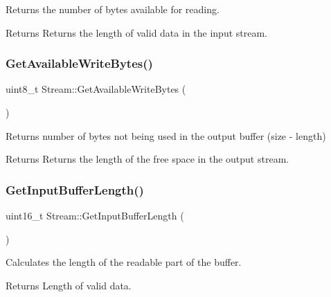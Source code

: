 Returns the number of bytes available for reading. \begin{DoxyReturn}{Returns}
Returns the length of valid data in the input stream. 
\end{DoxyReturn}
\hypertarget{class_stream_a6a16ddb03d3360cef4daf4d38245091d}{}\label{class_stream_a6a16ddb03d3360cef4daf4d38245091d} 
\subsubsection{\texorpdfstring{Get\+Available\+Write\+Bytes()}{GetAvailableWriteBytes()}}
{\footnotesize\ttfamily uint8\+\_\+t Stream\+::\+Get\+Available\+Write\+Bytes (\begin{DoxyParamCaption}{ }\end{DoxyParamCaption})\hspace{0.3cm}{\ttfamily [virtual]}}

Returns number of bytes not being used in the output buffer (size -\/ length) \begin{DoxyReturn}{Returns}
Returns the length of the free space in the output stream. 
\end{DoxyReturn}
\hypertarget{class_stream_a4860b9602c68ab437520d321e4e97212}{}\label{class_stream_a4860b9602c68ab437520d321e4e97212} 
\subsubsection{\texorpdfstring{Get\+Input\+Buffer\+Length()}{GetInputBufferLength()}}
{\footnotesize\ttfamily uint16\+\_\+t Stream\+::\+Get\+Input\+Buffer\+Length (\begin{DoxyParamCaption}{ }\end{DoxyParamCaption})\hspace{0.3cm}{\ttfamily [virtual]}}

Calculates the length of the readable part of the buffer. \begin{DoxyReturn}{Returns}
Length of valid data. 
\end{DoxyReturn}
\hypertarget{class_stream_ad8aea9131dbc1b422bdba2408d63492a}{}\label{class_stream_ad8aea9131dbc1b422bdba2408d63492a} 
